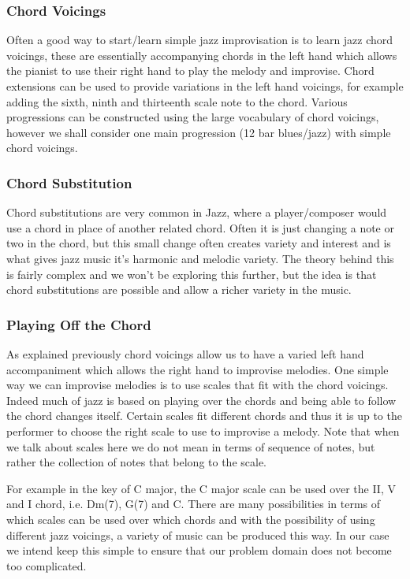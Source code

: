 \documentclass[pdftex,12pt,a4paper]{report}
\begin{document}
\subsubsection{Chord Voicings}
Often a good way to start/learn simple jazz improvisation is to learn jazz chord voicings, these are essentially accompanying chords in the left hand which allows the pianist to use their right hand to play the melody and improvise. Chord extensions can be used to provide variations in the left hand voicings, for example adding the sixth, ninth and thirteenth scale note to the chord. Various progressions can be constructed using the large vocabulary of chord voicings, however we shall consider one main progression (12 bar blues/jazz) with simple chord voicings.

\subsubsection{Chord Substitution}
Chord substitutions are very common in Jazz, where a player/composer would use a chord in place of another related chord. Often it is just changing a note or two in the chord, but this small change often creates variety and interest and is what gives jazz music it's harmonic and melodic variety. The theory behind this is fairly complex and we won't be exploring this further, but the idea is that chord substitutions are possible and allow a richer variety in the music.

\subsubsection{Playing Off the Chord}
As explained previously chord voicings allow us to have a varied left hand accompaniment which allows the right hand to improvise melodies. One simple way we can improvise melodies is to use scales that fit with the chord voicings. Indeed much of jazz is based on playing over the chords and being able to follow the chord changes itself. Certain scales fit different chords and thus it is up to the performer to choose the right scale to use to improvise a melody. Note that when we talk about scales here we do not mean in terms of sequence of notes, but rather the collection of notes that belong to the scale.

For example in the key of C major, the C major scale can be used over the II, V and I chord, i.e. Dm(7), G(7) and C. There are many possibilities in terms of which scales can be used over which chords and with the possibility of using different jazz voicings, a variety of music can be produced this way. In our case we intend keep this simple to ensure that our problem domain does not become too complicated.
\end{document}
